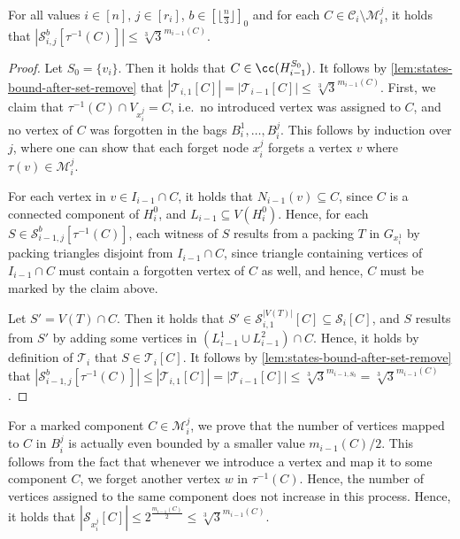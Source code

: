 \documentclass[a4paper,UKenglish,cleveref, autoref, thm-restate]{lipics-v2021}
\begin{document}
\begin{lemma}\label{lem:bound-states-unmarked-components}
    For all values $i\in[n]$, $j\in[r_i]$, $b\in [\lfloor\frac{n}{3}\rfloor]_0$ and for each $C \in \mathcal{C}_i \setminus \mathcal{M}_i^j$, it holds that $|\mathcal{S}_{i,j}^b[\tau^{-1}(C)]| \leq \sqrt[3]{3}^{m_{i-1}(C)}$.
\end{lemma}

\begin{proof}
    Let $S_0 = \{v_i\}$. Then it holds that $C\in\cc(H_{i-1}^{S_0})$. 
    It follows by \cref{lem:states-bound-after-set-remove} that $|\mathcal{T}_{i,1}[C]| = |\mathcal{T}_{i-1}[C]| \leq  \sqrt[3]{3}^{m_{i-1}(C)}$.
    First, we claim that $\tau^{-1}(C) \cap V_{x_i^j} = C$, i.e.\ no introduced vertex was assigned to $C$, and no vertex of $C$ was forgotten in the bags $B_i^1, \dots, B_i^j$. 
    This follows by induction over $j$, where one can show that each forget node $x_i^j$ forgets a vertex $v$ where $\tau(v)\in \mathcal{M}_i^j$. 

    For each vertex in $v\in I_{i-1}\cap C$, it holds that $N_{i-1}(v)\subseteq C$, since $C$ is a connected component of $H_i^0$, and $L_{i-1}\subseteq V(H_i^0)$. Hence, for each $S \in \mathcal{S}_{i-1, j}^b[\tau^{-1}(C)]$, each witness of $S$ results from a packing $T$ in $G_{x_i^1}$ by packing triangles disjoint from $I_{i-1}\cap C$, since triangle containing vertices of $I_{i-1}\cap C$ must contain a forgotten vertex of $C$ as well, and hence, $C$ must be marked by the claim above.

    Let $S' = V(T)\cap C$. Then it holds that $S' \in \mathcal{S}_{i,1}^{|V(T)|}[C] \subseteq \mathcal{S}_i[C]$, and $S$ results from $S'$ by adding some vertices in $(L_{i-1}^1\cup L_{i-1}^2)\cap C$. Hence, it holds by definition of $\mathcal{T}_i$ that $S\in \mathcal{T}_i[C]$. It follows by \cref{lem:states-bound-after-set-remove} that 
    $|\mathcal{S}_{i-1,j}^b[\tau^{-1}(C)]| \leq |\mathcal{T}_{i,1}[C]| = |\mathcal{T}_{i-1}[C]| \leq \sqrt[3]{3}^{m_{i-1, S_0}} = \sqrt[3]{3}^{m_{i-1}(C)}$.
\end{proof}
For a marked component $C\in \mathcal{M}_i^j$, we prove that the number of vertices mapped to $C$ in $B_i^j$ is actually even bounded by a smaller value $m_{i-1}(C)/2$. 
This follows from the fact that whenever we introduce a vertex and map it to some component $C$, we forget another vertex $w$ in $\tau^{-1}(C)$. 
Hence, the number of vertices assigned to the same component does not increase in this process. 
Hence, it holds that $|\mathcal{S}_{x_i^j}[C]| \leq2^{\frac{m_{i-1}(C)}{2}} \leq \sqrt[3]{3}^{m_{i-1}(C)}$.
\end{document}
